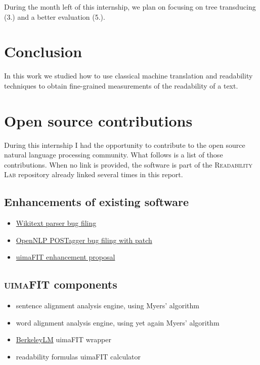 \documentclass[a4paper, 11pt, onepage]{scrreprt}
\begin{document}
During the month left of this internship, we plan on focusing on tree
transducing (3.) and a better evaluation (5.).

\chapter{Conclusion}

In this work we studied how to use classical machine translation and
readability techniques to obtain fine-grained measurements of the
readability of a text.




\appendix

\chapter{Open source contributions}
\label{cha:oss-contribs}

During this internship I had the opportunity to contribute to the open
source natural language processing community. What follows is a list
of those contributions. When no link is provided, the software is part
of the \textsc{Readability Lab} repository already linked several
times in this report.

\section{Enhancements of existing software}
\label{sec:enhancements}

\begin{itemize}
\item
  \href{https://bugs.eclipse.org/bugs/show_bug.cgi?id=433163}{Wikitext
    parser bug filing}
\item \href{https://issues.apache.org/jira/browse/OPENNLP-676}{OpenNLP
    POSTagger bug filing with patch}
\item \href{https://issues.apache.org/jira/browse/UIMA-3913}{uimaFIT
    enhancement proposal}
\end{itemize}

\section{\textsc{uimaFIT} components}
\label{sec:uimafit-components}

\begin{itemize}
\item sentence alignment analysis engine, using Myers' algorithm
\item word alignment analysis engine, using yet again Myers' algorithm
\item \href{https://berkeleylm.googlecode.com/}{BerkeleyLM} uimaFIT
  wrapper
\item readability formulas uimaFIT calculator
\end{itemize}
\end{document}

